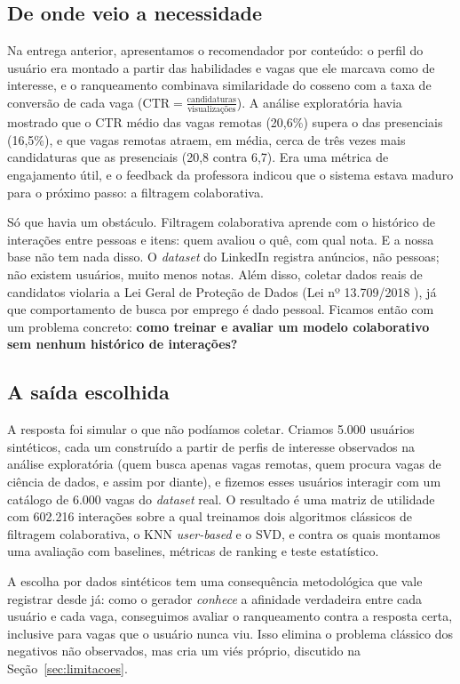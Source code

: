 \documentclass[12pt,a4paper]{article}
\begin{document}
\subsection{De onde veio a necessidade}

Na entrega anterior, apresentamos o recomendador por conteúdo: o perfil do usuário era montado a partir das habilidades e vagas que ele marcava como de interesse, e o ranqueamento combinava similaridade do cosseno com a taxa de conversão de cada vaga ($\text{CTR} = \frac{\text{candidaturas}}{\text{visualizações}}$). A análise exploratória havia mostrado que o CTR médio das vagas remotas (20,6\%) supera o das presenciais (16,5\%), e que vagas remotas atraem, em média, cerca de três vezes mais candidaturas que as presenciais (20,8 contra 6,7). Era uma métrica de engajamento útil, e o feedback da professora indicou que o sistema estava maduro para o próximo passo: a filtragem colaborativa.

Só que havia um obstáculo. Filtragem colaborativa aprende com o histórico de interações entre pessoas e itens: quem avaliou o quê, com qual nota. E a nossa base não tem nada disso. O \textit{dataset} do LinkedIn registra anúncios, não pessoas; não existem usuários, muito menos notas. Além disso, coletar dados reais de candidatos violaria a Lei Geral de Proteção de Dados (Lei nº 13.709/2018 \cite{lgpd}), já que comportamento de busca por emprego é dado pessoal. Ficamos então com um problema concreto: \textbf{como treinar e avaliar um modelo colaborativo sem nenhum histórico de interações?}

\subsection{A saída escolhida}

A resposta foi simular o que não podíamos coletar. Criamos 5.000 usuários sintéticos, cada um construído a partir de perfis de interesse observados na análise exploratória (quem busca apenas vagas remotas, quem procura vagas de ciência de dados, e assim por diante), e fizemos esses usuários interagir com um catálogo de 6.000 vagas do \textit{dataset} real. O resultado é uma matriz de utilidade com 602.216 interações sobre a qual treinamos dois algoritmos clássicos de filtragem colaborativa, o KNN \textit{user-based} e o SVD, e contra os quais montamos uma avaliação com baselines, métricas de ranking e teste estatístico.

A escolha por dados sintéticos tem uma consequência metodológica que vale registrar desde já: como o gerador \textit{conhece} a afinidade verdadeira entre cada usuário e cada vaga, conseguimos avaliar o ranqueamento contra a resposta certa, inclusive para vagas que o usuário nunca viu. Isso elimina o problema clássico dos negativos não observados, mas cria um viés próprio, discutido na Seção~\ref{sec:limitacoes}.
\end{document}
